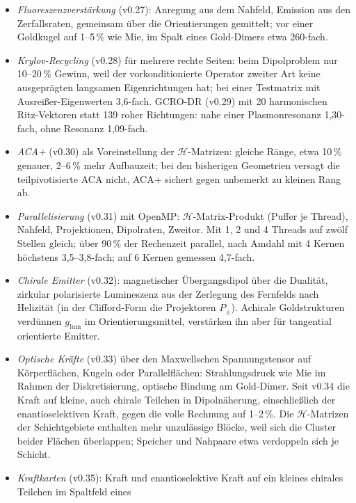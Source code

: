 \documentclass[11pt, a4paper]{article}
\begin{document}
\begin{itemize}[leftmargin=*]
    Dreiecke, kostet aber durch die kleinen Elemente Aufbauzeit der $\mathcal{H}$-Matrix.
  \item \emph{Fluoreszenzverstärkung} (v0.27): Anregung aus dem Nahfeld, Emission aus den Zerfallsraten, gemeinsam über die
    Orientierungen gemittelt; vor einer Goldkugel auf 1--5\,\% wie Mie, im Spalt eines Gold-Dimers etwa 260-fach.
  \item \emph{Krylov-Recycling} (v0.28) für mehrere rechte Seiten: beim Dipolproblem nur 10--20\,\% Gewinn, weil der
    vorkonditionierte Operator zweiter Art keine ausgeprägten langsamen Eigenrichtungen hat; bei einer Testmatrix mit
    Ausreißer-Eigenwerten 3,6-fach. GCRO-DR (v0.29) mit 20 harmonischen Ritz-Vektoren statt 139 roher Richtungen: nahe
    einer Plasmonresonanz 1,30-fach, ohne Resonanz 1,09-fach.
  \item \emph{ACA+} (v0.30) als Voreinstellung der $\mathcal{H}$-Matrizen: gleiche Ränge, etwa 10\,\% genauer, 2--6\,\% mehr
    Aufbauzeit; bei den bisherigen Geometrien versagt die teilpivotisierte ACA nicht, ACA+ sichert gegen unbemerkt zu kleinen
    Rang ab.
  \item \emph{Parallelisierung} (v0.31) mit OpenMP: $\mathcal{H}$-Matrix-Produkt (Puffer je Thread), Nahfeld, Projektionen,
    Dipolraten, Zweitor. Mit 1, 2 und 4 Threads auf zwölf Stellen gleich; über 90\,\% der Rechenzeit parallel, nach Amdahl mit
    4 Kernen höchstens 3,5--3,8-fach; auf 6 Kernen gemessen 4,7-fach.
  \item \emph{Chirale Emitter} (v0.32): magnetischer Übergangsdipol über die Dualität, zirkular polarisierte Lumineszenz aus der
    Zerlegung des Fernfelds nach Helizität (in der Clifford-Form die Projektoren $P_\pm$). Achirale Goldstrukturen verdünnen
    $g_{\mathrm{lum}}$ im Orientierungsmittel, verstärken ihn aber für tangential orientierte Emitter.
  \item \emph{Optische Kräfte} (v0.33) über den Maxwellschen Spannungstensor auf Körperflächen, Kugeln oder Parallelflächen:
    Strahlungsdruck wie Mie im Rahmen der Diskretisierung, optische Bindung am Gold-Dimer. Seit v0.34 die Kraft auf kleine,
    auch chirale Teilchen in Dipolnäherung, einschließlich der enantioselektiven Kraft, gegen die volle Rechnung auf 1--2\,\%. Die $\mathcal{H}$-Matrizen der Schichtgebiete
    enthalten mehr unzulässige Blöcke, weil sich die Cluster beider Flächen überlappen; Speicher und Nahpaare etwa
    verdoppeln sich je Schicht.
  \item \emph{Kraftkarten} (v0.35): Kraft und enantioselektive Kraft auf ein kleines chirales Teilchen im Spaltfeld eines

\end{itemize}
\end{document}
